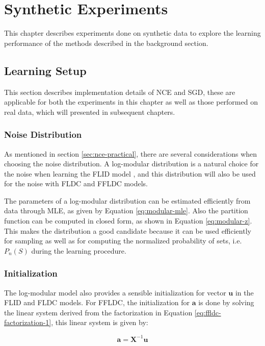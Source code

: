 \chapter{Synthetic Experiments}
\label{sec:synthetic}

This chapter describes experiments done on synthetic data to explore the learning performance of the methods described in the background section.

\section{Learning Setup}

This section describes implementation details of NCE and SGD, these are applicable for both the experiments in this chapter as well as those performed on real data, which will presented in subsequent chapters.

\subsection{Noise Distribution}

As mentioned in section \ref{sec:nce-practical}, there are several considerations when choosing the noise distribution. A log-modular distribution is a natural choice for the noise when learning the FLID model \citep{tschiatschek16learning}, and this distribution will also be used for the noise with FLDC and FFLDC models.

The parameters of a log-modular distribution can be estimated efficiently from data through MLE, as given by Equation \eqref{eq:modular-mle}. Also the partition function can be computed in closed form, as shown in Equation \eqref{eq:modular-z}. This makes the distribution a good candidate because it can be used efficiently for sampling as well as for computing the normalized probability of sets, i.e. $P_{n}(S)$ during the learning procedure.

\subsection{Initialization}

The log-modular model also provides a sensible initialization for vector $\mathbf{u}$ in the FLID and FLDC models. For FFLDC, the initialization for $\mathbf{a}$ is done by solving the linear system derived from the factorization in Equation \eqref{eq:ffldc-factorization-1}, this linear system is given by:

\begin{equation}
  \mathbf{a} = \mathbf{X}^{-1}\mathbf{u}
\end{equation}

